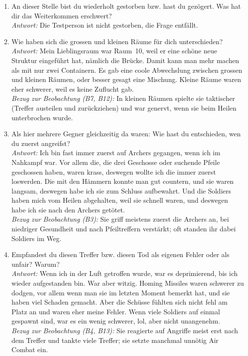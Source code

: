 \documentclass[../Main.tex]{subfiles}
\begin{document}
\begin{enumerate}[label=\textbf{I\arabic*}, leftmargin=1.5cm, itemsep=1em]
\item An dieser Stelle bist du wiederholt gestorben bzw. hast du gezögert. Was hat dir das Weiterkommen erschwert? \\
    \textit{Antwort:} Die Testperson ist nicht gestorben, die Frage entfällt.

\item Wie haben sich die grossen und kleinen Räume für dich unterschieden? \\
    \textit{Antwort:} Mein Lieblingsraum war Raum~10, weil er eine schöne neue Struktur eingeführt hat, nämlich die Brücke. Damit kann man mehr machen als mit nur zwei Containern. Es gab eine coole Abwechslung zwischen grossen und kleinen Räumen, oder besser gesagt eine Mischung. Kleine Räume waren eher schwerer, weil es keine Zuflucht gab. \\
    \textit{Bezug zur Beobachtung (B7, B12):} In kleinen Räumen spielte sie taktischer (Treffer austeilen und zurückziehen) und war genervt, wenn sie beim Heilen unterbrochen wurde.

\item Als hier mehrere Gegner gleichzeitig da waren: Wie hast du entschieden, wen du zuerst angreifst? \\
    \textit{Antwort:} Ich bin fast immer zuerst auf Archers gegangen, wenn ich im Nahkampf war. Vor allem die, die drei Geschosse oder suchende Pfeile geschossen haben, waren krass, deswegen wollte ich die immer zuerst loswerden. Die mit den Hämmern konnte man gut countern, und sie waren langsam, deswegen habe ich sie zum Schluss aufbewahrt. Und die Soldiers haben mich vom Heilen abgehalten, weil sie schnell waren, und deswegen habe ich sie nach den Archers getötet. \\
    \textit{Bezug zur Beobachtung (B3):} Sie griff meistens zuerst die Archers an, bei niedriger Gesundheit und nach Pfeiltreffern verstärkt; oft standen ihr dabei Soldiers im Weg.

\item Empfandest du diesen Treffer bzw. diesen Tod als eigenen Fehler oder als unfair? Warum? \\
    \textit{Antwort:} Wenn ich in der Luft getroffen wurde, war es deprimierend, bis ich wieder aufgestanden bin. War aber witzig. Homing Missiles waren schwerer zu dodgen, vor allem wenn man sie im letzten Moment bemerkt hat, und sie haben viel Schaden gemacht. Aber die Schüsse fühlten sich nicht fehl am Platz an und waren eher meine Fehler. Wenn viele Soldiers auf einmal gespawnt sind, war es ein wenig schwerer, lol, aber nicht unangenehm. \\
    \textit{Bezug zur Beobachtung (B4, B13):} Sie reagierte auf Angriffe meist erst nach dem Treffer und tankte viele Treffer; sie setzte manchmal unnötig Air Combat ein.


\end{enumerate}
\end{document}
